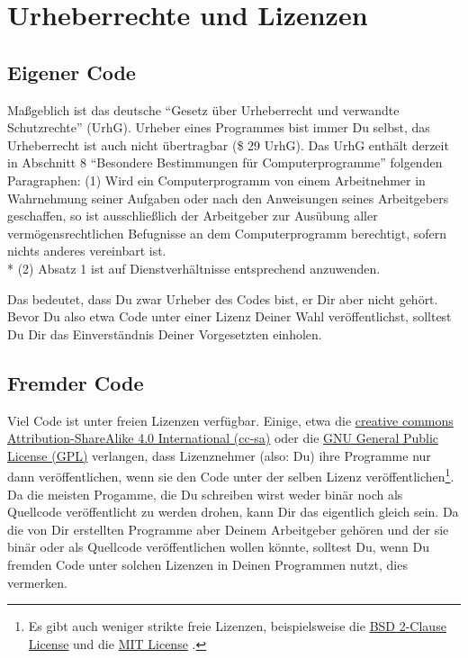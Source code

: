 \documentclass[twoside]{scrreprt}
\begin{document}
\section{Urheberrechte und Lizenzen}
\subsection{Eigener Code}
Ma\ss{}geblich ist das deutsche "`Gesetz \"u{}ber Urheberrecht und verwandte
Schutzrechte"' (UrhG). 
Urheber eines Programmes bist immer Du selbst, das Urheberrecht ist auch nicht
\"u{}bertragbar (\$ 29 UrhG).
Das UrhG enth\"a{}lt derzeit in Abschnitt 8 "`Besondere Bestimmungen
f\"u{}r 
Computerprogramme"' folgenden Paragraphen:
(1) Wird ein Computerprogramm von einem Arbeitnehmer in Wahrnehmung seiner
Aufgaben oder nach den Anweisungen seines Arbeitgebers geschaffen, so ist
ausschlie\ss{}lich der Arbeitgeber zur Aus\"u{}bung aller 
verm\"o{}gensrechtlichen Befugnisse an dem Computerprogramm berechtigt, sofern 
nichts anderes vereinbart ist.\\*
(2) Absatz 1 ist auf Dienstverh\"a{}ltnisse entsprechend anzuwenden.

Das bedeutet, dass Du zwar Urheber des Codes bist, er Dir aber nicht
geh\"o{}rt. Bevor Du also etwa Code unter einer Lizenz Deiner Wahl
ver\"o{}ffentlichst, solltest Du Dir das Einverst\"a{}ndnis Deiner Vorgesetzten 
einholen.

\subsection{Fremder Code\label{sec:copy_foreign}}
Viel Code ist unter freien Lizenzen verf\"u{}gbar. Einige, etwa die
\href{https://creativecommons.org/licenses/by-sa/4.0/legalcode}{creative commons
Attribution-ShareAlike 4.0 International (cc-sa)} oder die
\href{http://www.gnu.org/licenses/gpl-3.0.html}{GNU General Public License
(GPL)} verlangen, dass Lizenznehmer (also: Du) ihre Programme nur dann
ver\"o{}ffentlichen, wenn sie den Code unter der selben Lizenz
ver\"o{}ffentlichen\footnote{Es gibt auch weniger strikte freie Lizenzen,
beispielsweise die 
\href{http://opensource.org/licenses/BSD-2-Clause}{BSD 2-Clause License} und
die 
\href{http://opensource.org/licenses/MIT}{MIT License}%
. }.
Da die meisten Progamme, die Du schreiben wirst weder bin\"a{}r noch als
Quellcode ver\"o{}ffentlicht zu werden drohen, kann Dir das eigentlich gleich 
sein.
Da die von Dir erstellten Programme aber Deinem Arbeitgeber geh\"o{}ren und der
sie bin\"a{}r oder als Quellcode ver\"o{}ffentlichen wollen  k\"o{}nnte, 
solltest Du, wenn Du fremden Code unter solchen Lizenzen in Deinen Programmen
nutzt, dies vermerken.
\end{document}

